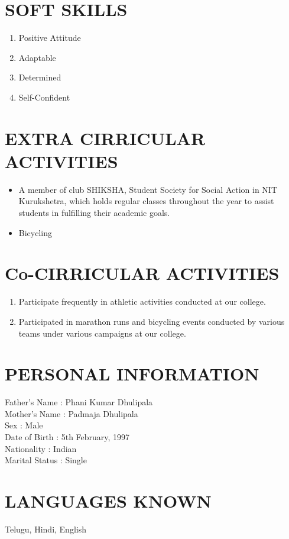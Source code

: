 \documentclass[a4paper]{article}
\begin{document}
\section*{\textbf{SOFT SKILLS}}
\begin{enumerate}
\item Positive Attitude
\item Adaptable
\item Determined
\item Self-Confident
\end{enumerate}

\section*{\textbf{EXTRA CIRRICULAR ACTIVITIES}}
\begin{itemize}
\item A member of club SHIKSHA, Student Society for Social Action in NIT Kurukshetra, which holds regular classes throughout the year to assist students in fulfilling their academic goals. 
\item Bicycling
\end{itemize}

\section*{\textbf{Co-CIRRICULAR ACTIVITIES}}
\begin{enumerate}
\item Participate frequently in athletic activities conducted at our college.
\item Participated in marathon runs and bicycling events  conducted by various teams under various campaigns at our college.
\end{enumerate}

\section*{\textbf{PERSONAL INFORMATION}}
Father's Name  : Phani Kumar Dhulipala\\
Mother's Name  : Padmaja Dhulipala\\
Sex            : Male\\
Date of Birth  : 5th February, 1997\\
Nationality    : Indian\\
Marital Status : Single

\section*{\textbf{LANGUAGES KNOWN}}
Telugu, Hindi, English
\end{document}
